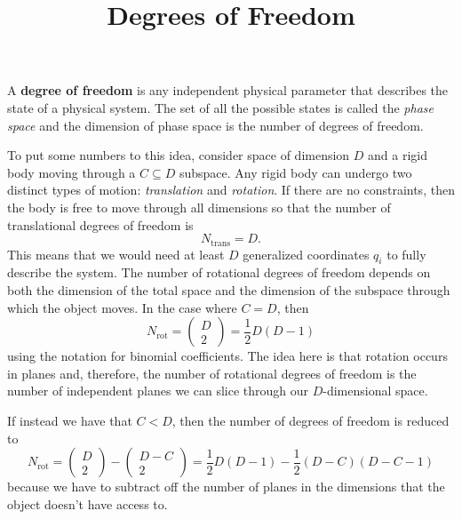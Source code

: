 \documentclass{article}
\title{Degrees of Freedom}
\begin{document}
\maketitle

A \textbf{degree of freedom} is any independent physical parameter that
describes the state of a physical system. The set of all the possible states is
called the \textit{phase space} and the dimension of phase space is the number
of degrees of freedom. 

To put some numbers to this idea, consider space of dimension $D$ and a rigid
body moving through a $C\subseteq D$ subspace. Any rigid body can undergo two
distinct types of motion: \textit{translation} and \textit{rotation}. If there
are no constraints, then the body is free to move through all dimensions so that
the number of translational degrees of freedom is
\begin{equation}
  N_{\textrm{trans}} = D.
\end{equation}
This means that we would need at least $D$ generalized coordinates $q_i$ to
fully describe the system. The number of rotational degrees of freedom depends
on both the dimension of the total space and the dimension of the subspace
through which the object moves. In the case where $C=D$, then
\begin{equation}
  N_{\textrm{rot}} = \begin{pmatrix}D \\ 2\end{pmatrix} = \frac{1}{2}D(D-1)
\end{equation}
using the notation for binomial coefficients. The idea here is that rotation
occurs in planes and, therefore, the number of rotational degrees of freedom is
the number of independent planes we can slice through our $D$-dimensional space.

If instead we have that $C<D$, then the number of degrees of freedom is reduced
to
\begin{equation}
  N_{\textrm{rot}}= \begin{pmatrix}D\\2\end{pmatrix}-\begin{pmatrix}D-C\\2\end{pmatrix}
  = \frac{1}{2}D(D-1)-\frac{1}{2}(D-C)(D-C-1)
\end{equation}
because we have to subtract off the number of planes in the dimensions that the
object doesn't have access to. 
\end{document}
